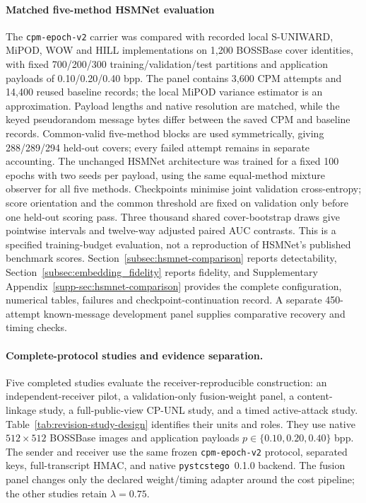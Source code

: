 \documentclass[pdflatex,sn-mathphys-num]{sn-jnl}%
\theoremstyle{definition}
\theoremstyle{game}
\theoremstyle{thmstyleone}%
\theoremstyle{thmstyletwo}%
\theoremstyle{thmstylethree}%
\begin{document}
\paragraph{Matched five-method HSMNet evaluation}
The \texttt{cpm-epoch-v2} carrier was compared with recorded local
S-UNIWARD, MiPOD, WOW and HILL implementations on 1,200 BOSSBase cover
identities, with fixed 700/200/300 training/validation/test partitions and
application payloads of 0.10/0.20/0.40 bpp. The panel contains 3,600 CPM attempts and 14,400 reused baseline records; the local MiPOD variance
estimator is an approximation. Payload lengths and native resolution are
matched, while the keyed pseudorandom message bytes differ between the
saved CPM and baseline records. Common-valid five-method blocks are used
symmetrically, giving 288/289/294 held-out covers; every failed attempt
remains in separate accounting. The unchanged HSMNet architecture
\cite{Yang2026HSMNet} was trained for a fixed 100 epochs with two seeds per
payload, using the same equal-method mixture observer for all five
methods. Checkpoints minimise joint validation cross-entropy; score
orientation and the common threshold are fixed on validation only before
one held-out scoring pass. Three thousand shared cover-bootstrap draws
give pointwise intervals and twelve-way adjusted paired AUC contrasts.
This is a specified training-budget evaluation, not a reproduction of
HSMNet's published benchmark scores. Section~\ref{subsec:hsmnet-comparison}
reports detectability, Section~\ref{subsec:embedding_fidelity} reports
fidelity, and Supplementary Appendix~\ref{supp-sec:hsmnet-comparison}
provides the complete configuration, numerical tables, failures and
checkpoint-continuation record. A separate 450-attempt known-message
development panel supplies comparative recovery and timing checks.

\paragraph{Complete-protocol studies and evidence separation.}
Five completed studies evaluate the receiver-reproducible construction:
an independent-receiver pilot, a validation-only fusion-weight panel,
a content-linkage study, a full-public-view CP-UNL study, and a timed
active-attack study. Table~\ref{tab:revision-study-design} identifies their
units and roles. They use native $512\times512$ BOSSBase images and
application payloads $p\in\{0.10,0.20,0.40\}$ bpp. The sender and receiver
use the same frozen \texttt{cpm-epoch-v2} protocol, separated keys,
full-transcript HMAC, and native \texttt{pystcstego}~0.1.0 backend. The
fusion panel changes only the declared weight/timing adapter around the
cost pipeline; the other studies retain $\lambda=0.75$.
\end{document}
